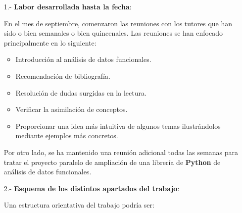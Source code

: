 \documentclass[a4paper,oneside,11pt,leqno]{article}
\begin{document}
\begin{enumerate}

      \item[1.-] {\bf Labor desarrollada hasta la fecha}:

            En el mes de septiembre, comenzaron las reuniones con los tutores que han sido o bien semanales o bien quincenales.
            Las reuniones se han enfocado principalmente en lo siguiente:
            \begin{itemize}
                  \item Introducción al análisis de datos funcionales.
                  \item Recomendación de bibliografía.
                  \item Resolución de dudas surgidas en la lectura.
                  \item Verificar la asimilación de conceptos.
                  \item Proporcionar una idea más intuitiva de algunos temas ilustrándolos mediante ejemplos más concretos.
            \end{itemize}

            Por otro lado, se ha mantenido una reunión adicional todas las semanas para tratar el proyecto paralelo de ampliación
            de una librería de \textbf{Python} \cite{scikit-fda} de análisis de datos funcionales.

      \item[2.-] {\bf Esquema de los distintos apartados del trabajo}:

            Una estructura orientativa del trabajo podría ser:


\end{enumerate}
\end{document}

